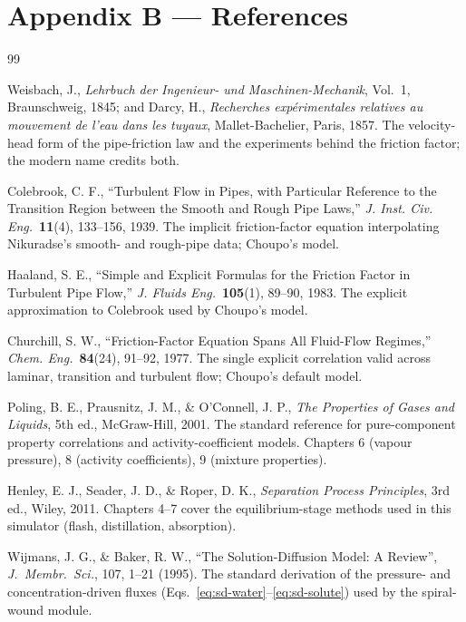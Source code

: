 \documentclass[11pt,a4paper]{article}
\begin{document}
\clearpage
\section*{Appendix B --- References}
{}

\begin{thebibliography}{99}

 Weisbach, J., \emph{Lehrbuch der Ingenieur- und
Maschinen-Mechanik}, Vol.~1, Braunschweig, 1845; and Darcy, H.,
\emph{Recherches exp\'erimentales relatives au mouvement de l'eau dans
les tuyaux}, Mallet-Bachelier, Paris, 1857.  The velocity-head form of
the pipe-friction law and the experiments behind the friction factor;
the modern name credits both.

 Colebrook, C. F., ``Turbulent Flow in Pipes,
with Particular Reference to the Transition Region between the Smooth and
Rough Pipe Laws,'' \emph{J. Inst. Civ. Eng.}\ \textbf{11}(4),
133--156, 1939.  The implicit friction-factor equation interpolating
Nikuradse's smooth- and rough-pipe data; Choupo's 
model.

 Haaland, S. E., ``Simple and Explicit Formulas for
the Friction Factor in Turbulent Pipe Flow,'' \emph{J. Fluids Eng.}\
\textbf{105}(1), 89--90, 1983.  The explicit approximation to
Colebrook used by Choupo's  model.

 Churchill, S. W., ``Friction-Factor Equation
Spans All Fluid-Flow Regimes,'' \emph{Chem. Eng.}\ \textbf{84}(24),
91--92, 1977.  The single explicit correlation valid across laminar,
transition and turbulent flow; Choupo's default \code{Churchill}
model.


 Poling, B. E., Prausnitz, J. M., \& O'Connell, J. P.,
\emph{The Properties of Gases and Liquids}, 5th ed., McGraw-Hill,
2001. The standard reference for pure-component property correlations
and activity-coefficient models. Chapters 6 (vapour pressure), 8
(activity coefficients), 9 (mixture properties).

 Henley, E. J., Seader, J. D., \& Roper, D. K.,
\emph{Separation Process Principles}, 3rd ed., Wiley, 2011. Chapters
4--7 cover the equilibrium-stage methods used in this simulator
(flash, distillation, absorption).

 Wijmans, J. G., \& Baker, R. W., ``The
Solution-Diffusion Model: A Review'', \emph{J.\ Membr.\ Sci.}, 107,
1--21 (1995). The standard derivation of the pressure- and
concentration-driven fluxes (Eqs.~\ref{eq:sd-water}--\ref{eq:sd-solute})
used by the spiral-wound module.


\end{thebibliography}
\end{document}
